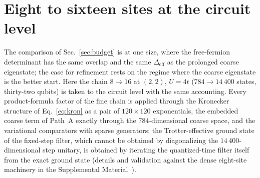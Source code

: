 \documentclass[a4paper,11pt,noarxiv]{quantumarticle}
\newcommand{\Deff}{\Delta_{\mathrm{eff}}}
\newcommand{\SM}{Supplemental Material~\cite{SM}}
\begin{document}
\section{Eight to sixteen sites at the circuit level}
\label{sec:large}
The comparison of Sec.~\ref{sec:budget} is at one size, where the
free-fermion determinant has the same overlap and the same $\Deff$ as the
prolonged coarse eigenstate; the case for refinement rests on the regime
where the coarse eigenstate is the better start.  Here the chain $8\to16$
at $(2,2)$, $U=4t$ ($784\to14\,400$ states, thirty-two qubits) is taken to
the circuit level with the same accounting.  Every product-formula factor
of the fine chain is applied through the Kronecker structure of
Eq.~\eqref{eq:kron} as a pair of $120\times120$ exponentials, the embedded
coarse term of Path~A exactly through the $784$-dimensional coarse space,
and the variational comparators with sparse generators; the
Trotter-effective ground state of the fixed-step filter, which cannot be
obtained by diagonalizing the $14\,400$-dimensional step unitary, is
obtained by iterating the quantized-time filter itself from the exact
ground state (details and validation against the dense eight-site machinery
in the \SM).
\end{document}

